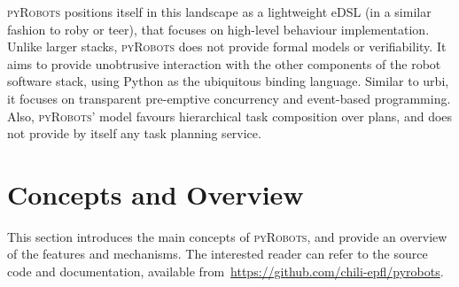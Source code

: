 \documentclass[a4paper, 10pt, conference]{ieeeconf}      %
\newcommand{\pyRobots}{\textsc{pyRobots}}
\begin{document}
\pyRobots{} positions itself in this landscape as a lightweight eDSL (in a
similar fashion to {\sc roby} or {\sc teer}), that focuses on high-level
behaviour implementation. Unlike larger stacks, \pyRobots{} does not provide
formal models or verifiability. It aims to provide unobtrusive interaction with
the other components of the robot software stack, using Python as the ubiquitous
binding language. Similar to {\sc urbi}, it focuses on transparent pre-emptive
concurrency and event-based programming.  Also, \pyRobots{}' model favours
hierarchical task composition over plans, and does not provide by itself any
task planning service.

%
%
%
%
%
\section{Concepts and Overview}

This section introduces the main concepts of \pyRobots{}, and provide an
overview of the features and mechanisms. The interested reader can refer to
the source code and documentation, available
from~\url{https://github.com/chili-epfl/pyrobots}.
\end{document}
